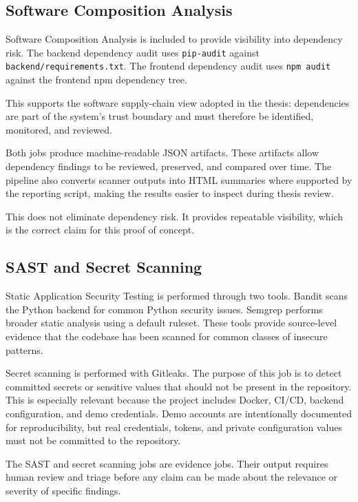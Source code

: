 \documentclass[12pt,a4paper]{report}
\begin{document}
\subsection{Software Composition Analysis}

Software Composition Analysis is included to provide visibility into dependency risk. The backend dependency audit uses \texttt{pip-audit} against \texttt{backend/requirements.txt}. The frontend dependency audit uses \texttt{npm audit} against the frontend npm dependency tree.

This supports the software supply-chain view adopted in the thesis: dependencies are part of the system's trust boundary and must therefore be identified, monitored, and reviewed.

Both jobs produce machine-readable JSON artifacts. These artifacts allow dependency findings to be reviewed, preserved, and compared over time. The pipeline also converts scanner outputs into HTML summaries where supported by the reporting script, making the results easier to inspect during thesis review.

This does not eliminate dependency risk. It provides repeatable visibility, which is the correct claim for this proof of concept.

\subsection{SAST and Secret Scanning}

Static Application Security Testing is performed through two tools. Bandit scans the Python backend for common Python security issues. Semgrep performs broader static analysis using a default ruleset. These tools provide source-level evidence that the codebase has been scanned for common classes of insecure patterns.

Secret scanning is performed with Gitleaks. The purpose of this job is to detect committed secrets or sensitive values that should not be present in the repository. This is especially relevant because the project includes Docker, CI/CD, backend configuration, and demo credentials. Demo accounts are intentionally documented for reproducibility, but real credentials, tokens, and private configuration values must not be committed to the repository.

The SAST and secret scanning jobs are evidence jobs. Their output requires human review and triage before any claim can be made about the relevance or severity of specific findings.
\end{document}
